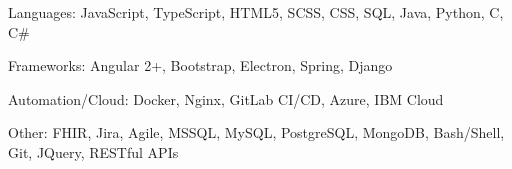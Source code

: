 

\begin{cvskills}

  \cvskill
    {Languages: } %
    {JavaScript, TypeScript, HTML5, SCSS, CSS, SQL, Java, Python, C, C\#} 
    
  \cvskill
    {Frameworks: } %
    {Angular 2+, Bootstrap, Electron, Spring, Django} 
    
 \cvskill
    {Automation/Cloud: } %
    {Docker, Nginx, GitLab CI/CD, Azure, IBM Cloud}
    
 \cvskill
    {Other: } %
    {FHIR, Jira, Agile, MSSQL, MySQL, PostgreSQL, MongoDB, Bash/Shell, Git, JQuery, RESTful APIs}
\end{cvskills}
